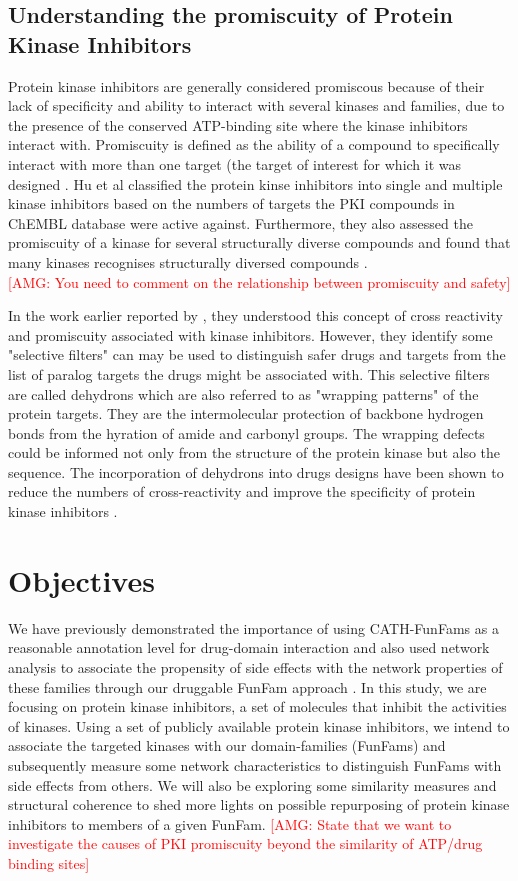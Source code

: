 \documentclass[a4paper, 11pt]{article}
\newcommand{\redcomment}[1]{\textcolor{red}{[#1]}} %
\begin{document}
\subsection*{Understanding the promiscuity of Protein Kinase Inhibitors}

Protein kinase inhibitors are generally considered promiscous because of their lack of specificity and ability to interact with several kinases and families, due to the presence of the conserved ATP-binding site where the kinase inhibitors interact with. Promiscuity is defined as the ability of a compound to specifically interact with more than one target (the target of interest for which it was designed \cite{hu2017mapping}. Hu et al classified the protein kinse inhibitors into single and multiple kinase inhibitors based on the numbers of targets the PKI compounds in ChEMBL database were active against. Furthermore, they also assessed the promiscuity of a kinase for several structurally diverse compounds and found that many kinases recognises structurally diversed compounds \cite{hu2017mapping}.\\

\redcomment{AMG: You need to comment on the relationship between promiscuity and safety}

In the work earlier reported by \cite{zhang2008turning}, they understood this concept of cross reactivity and promiscuity associated with kinase inhibitors. However, they identify some "selective filters" can may be used to distinguish safer drugs and targets from the list of paralog targets the drugs might be associated with. This selective filters are called dehydrons which are also referred to as "wrapping patterns" of the protein targets. They are the intermolecular protection of backbone hydrogen bonds from the hyration of amide and carbonyl groups. The wrapping defects could be informed not only from the structure of the protein kinase but also the sequence. The incorporation of dehydrons into drugs designs have been shown to reduce the numbers of cross-reactivity and improve the specificity of protein kinase inhibitors \cite{zhang2008turning}.
\newpage
\section*{Objectives}
We have previously demonstrated the importance of using CATH-FunFams as a reasonable annotation level for drug-domain interaction and also used network analysis to associate the propensity of side effects with the network properties of these families through our druggable FunFam approach \cite{moya2017structural}. In this study, we are focusing on protein kinase inhibitors, a set of molecules that inhibit the activities of kinases. Using a set of publicly available protein kinase inhibitors, we intend to associate the targeted kinases with our domain-families (FunFams) and subsequently measure some network characteristics to distinguish FunFams with side effects from others. We will also be exploring some similarity measures and structural coherence to shed more lights on possible repurposing of protein kinase inhibitors to members of a given FunFam.
\redcomment{AMG: State that we want to investigate the causes of PKI promiscuity beyond the similarity of ATP/drug binding sites}
\end{document}
